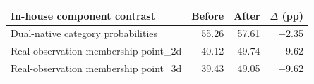 \begin{tabular}{lrrr}
\toprule
In-house component contrast & Before & After & $\Delta$ (pp) \\
\midrule
Dual-native category probabilities & 55.26 & 57.61 & +2.35 \\
Real-observation membership point\_2d & 40.12 & 49.74 & +9.62 \\
Real-observation membership point\_3d & 39.43 & 49.05 & +9.62 \\
\bottomrule
\end{tabular}
